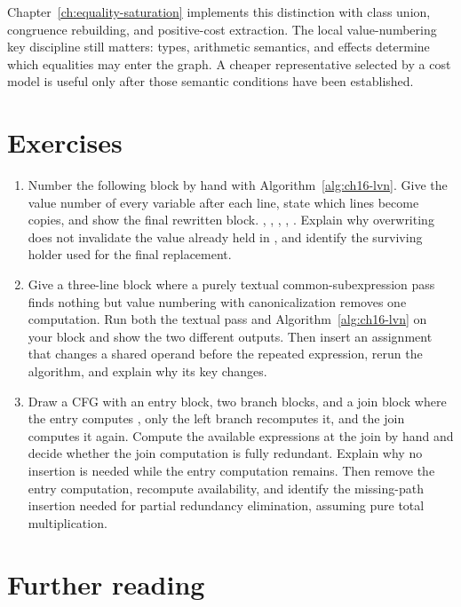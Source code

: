 Chapter~\ref{ch:equality-saturation} implements this distinction with class union, congruence rebuilding, and positive-cost extraction.
The local value-numbering key discipline still matters: types, arithmetic semantics, and effects determine which equalities may enter the graph.
A cheaper representative selected by a cost model is useful only after those semantic conditions have been established.

\section{Exercises}
\label{sec:ch16-exercises}

\begin{enumerate}
  \item \label{ex:ch16-trace-kill}
  Number the following block by hand with Algorithm~\ref{alg:ch16-lvn}.
  Give the value number of every variable after each line, state which lines become copies, and show the final rewritten block.
  , , , , .
  Explain why overwriting  does not invalidate the value already held in , and identify the surviving holder used for the final replacement.
  \item \label{ex:ch16-commutative-miss}
  Give a three-line block where a purely textual common-subexpression pass finds nothing but value numbering with canonicalization removes one computation.
  Run both the textual pass and Algorithm~\ref{alg:ch16-lvn} on your block and show the two different outputs.
  Then insert an assignment that changes a shared operand before the repeated expression, rerun the algorithm, and explain why its key changes.
  \item \label{ex:ch16-global-availability}
  Draw a CFG with an entry block, two branch blocks, and a join block where the entry computes , only the left branch recomputes it, and the join computes it again.
  Compute the available expressions at the join by hand and decide whether the join computation is fully redundant.
  Explain why no insertion is needed while the entry computation remains.
  Then remove the entry computation, recompute availability, and identify the missing-path insertion needed for partial redundancy elimination, assuming pure total multiplication.
\end{enumerate}

\section{Further reading}
\label{sec:ch16-further-reading}

